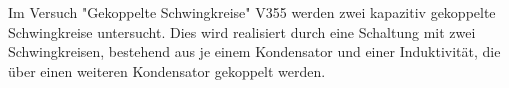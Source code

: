 Im Versuch "Gekoppelte Schwingkreise"  V355 werden zwei kapazitiv gekoppelte Schwingkreise untersucht. Dies wird realisiert durch eine Schaltung mit zwei Schwingkreisen, bestehend aus je einem Kondensator und einer Induktivität, die über einen weiteren Kondensator gekoppelt werden.
